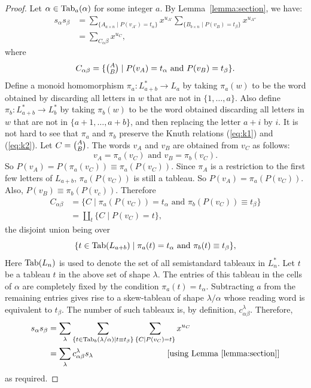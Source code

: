 \documentclass[11pt]{amsproc}
\theoremstyle{definition}
\theoremstyle{example}
\newcommand{\Tab}{\textup{Tab}}
\begin{document}
\begin{proof}
  Let $\alpha\in \Tab_a(\alpha)$ for some integer $a$.
  By Lemma~\ref{lemma:section}, we have:
  \begin{align}
    \nonumber s_\alpha s_\beta & = \sum_{\{A_{a\times n}\mid P(v_{A'}) = t_\alpha\}} x^{u_{A'}} \sum_{\{B_{b\times n}\mid P(v_B) = t_\beta\}} x^{u_{A''}}\\
    \label{eq:sum-C} & = \sum_{C_\alpha\beta} x^{u_C},
  \end{align}
  where
  \begin{displaymath}
    C_{\alpha\beta} = \{\tbinom AB\mid P(v_A)=t_\alpha\text{ and } P(v_B)=t_\beta\}.
  \end{displaymath}
  Define a monoid homomorphism $\pi_a:L_{a+b}^*\to L_a$ by taking $\pi_a(w)$ to be the word obtained by discarding all letters in $w$ that are not in $\{1,\dotsc,a\}$.
  Also define $\pi_b:L_{a+b}^*\to L_b^*$ by taking $\pi_b(w)$ to be the word obtained discarding all letters in $w$ that are not in $\{a+1,\dotsc, a+b\}$, and then replacing the letter $a+i$ by $i$.
  It is not hard to see that $\pi_a$ and $\pi_b$ preserve the Knuth relations (\ref{eq:k1}) and (\ref{eq:k2}).
  Let $C=\tbinom AB$.
  The words $v_A$ and $v_B$ are obtained from $v_C$ as follows:
  \begin{displaymath}
    v_A = \pi_a(v_C) \text{ and } v_B = \pi_b(v_C).
  \end{displaymath}
  So $P(v_A) = P(\pi_a(v_C)) \equiv \pi_a(P(v_C))$.
  Since $\pi_A$ is a restriction to the first few letters of $L_{a+b}$, $\pi_a(P(v_C))$ is still a tableau.
  So $P(v_A) = \pi_a(P(v_C))$.
  Also, $P(v_B) \equiv \pi_b(P(v_c))$.
  Therefore
  \begin{align*}
    C_{\alpha\beta} & = \{C \mid \pi_a(P(v_C)) = t_\alpha \text{ and } \pi_b(P(v_C))\equiv  t_\beta\}\\
    & = \coprod_t \{C\mid P(v_C)=t\},
  \end{align*}
  the disjoint union being over
  \begin{displaymath}
    \{t\in \Tab(L_{a+b})\mid \pi_a(t)=t_\alpha \text{ and } \pi_b(t)\equiv t_\beta\},
  \end{displaymath}
  Here $\Tab(L_n)$ is used to denote the set of all semistandard tableaux in $L_n^*$.
  Let $t$ be a tableau $t$ in the above set of shape $\lambda$.
  The entries of this tableau in the cells of $\alpha$ are completely fixed by the condition $\pi_a(t)=t_\alpha$.
  Subtracting $a$ from the remaining entries gives rise to a skew-tableau of shape $\lambda/\alpha$ whose reading word is equivalent to $t_\beta$.
  The number of such tableaux is, by definition, $c^\lambda_{\alpha\beta}$. Therefore,
  \begin{align*}
    s_\alpha s_\beta &= \sum_\lambda \sum_{\{t\in \Tab_b(\lambda/\alpha)\mid t\equiv t_\beta\}} \sum_{\{C\mid P(v_C)=t\}} x^{u_C}\\
    &=\sum_\lambda c^\lambda_{\alpha\beta} s_\lambda \hspace{3cm}\text{ [using Lemma~\ref{lemma:section}]}
  \end{align*}
  as required.
\end{proof}
\end{document}
